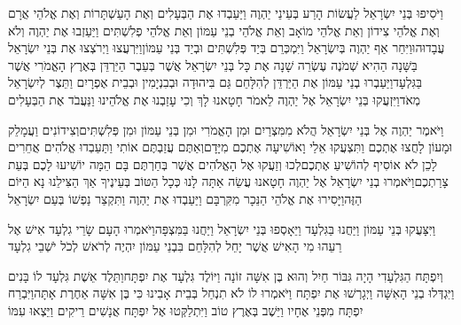\documentclass[../main/main.tex]{subfiles}
\begin{document}
\begin{multicols*}{\ncols}
וַיֹּסִיפוּ בְּנֵי יִשְׂרָאֵל לַעֲשׂוֹת הָרַע בְּעֵינֵי יַהְוֶה וַיַּעַבְדוּ אֶת הַבְּעָלִים וְאֶת הָעַשְׁתָּרוֹת וְאֶת אֱלֹהֵי אֲרָם וְאֶת אֱלֹהֵי צִידוֹן וְאֵת אֱלֹהֵי מוֹאָב וְאֵת אֱלֹהֵי בְנֵי עַמּוֹן וְאֵת אֱלֹהֵי פְלִשְׁתִּים וַיַּעַזְבוּ אֶת יַהְוֶה וְלֹא עֲבָדוּהוּ\PreVerseSpace{}וַיִּחַר אַף יַהְוֶה בְּיִשְׂרָאֵל וַיִּמְכְּרֵם בְּיַד פְּלִשְׁתִּים וּבְיַד בְּנֵי עַמּוֹן\PreVerseSpace{}וַיִּרְעֲצוּ וַיְרֹצְצוּ אֶת בְּנֵי יִשְׂרָאֵל בַּשָּׁנָה הַהִיא שְׁמֹנֶה עֶשְׂרֵה שָׁנָה אֶת כָּל בְּנֵי יִשְׂרָאֵל אֲשֶׁר בְּעֵבֶר הַיַּרְדֵּן בְּאֶרֶץ הָאֱמֹרִי אֲשֶׁר בַּגִּלְעָד\PreVerseSpace{}וַיַּעַבְרוּ בְנֵי עַמּוֹן אֶת הַיַּרְדֵּן לְהִלָּחֵם גַּם בִּיהוּדָה וּבְבִנְיָמִין וּבְבֵית אֶפְרָיִם וַתֵּצֶר לְיִשְׂרָאֵל מְאֹד\PreVerseSpace{}וַיִּזְעֲקוּ בְּנֵי יִשְׂרָאֵל אֶל יַהְוֶה לֵאמֹר חָטָאנוּ לָךְ וְכִי עָזַבְנוּ אֶת אֱלֹהֵינוּ וַנַּעֲבֹד אֶת הַבְּעָלִים\OpenSection{}\par
{}וַיֹּאמֶר יַהְוֶה אֶל בְּנֵי יִשְׂרָאֵל הֲלֹא מִמִּצְרַיִם וּמִן הָאֱמֹרִי וּמִן בְּנֵי עַמּוֹן וּמִן פְּלִשְׁתִּים\PreVerseSpace{}וְצִידוֹנִים וַעֲמָלֵק וּמָעוֹן לָחֲצוּ אֶתְכֶם וַתִּצְעֲקוּ אֵלַי וָאוֹשִׁיעָה אֶתְכֶם מִיָּדָם\PreVerseSpace{}וְאַתֶּם עֲזַבְתֶּם אוֹתִי וַתַּעַבְדוּ אֱלֹהִים אֲחֵרִים לָכֵן לֹא אוֹסִיף לְהוֹשִׁיעַ אֶתְכֶם\PreVerseSpace{}לְכוּ וְזַעֲקוּ אֶל הָאֱלֹהִים אֲשֶׁר בְּחַרְתֶּם בָּם הֵמָּה יוֹשִׁיעוּ לָכֶם בְּעֵת צָרַתְכֶם\PreVerseSpace{}וַיֹּאמְרוּ בְנֵי יִשְׂרָאֵל אֶל יַהְוֶה חָטָאנוּ עֲשֵׂה אַתָּה לָנוּ כְּכָל הַטּוֹב בְּעֵינֶיךָ אַךְ הַצִּילֵנוּ נָא הַיּוֹם הַזֶּה\PreVerseSpace{}וַיָּסִירוּ אֶת אֱלֹהֵי הַנֵּכָר מִקִּרְבָּם וַיַּעַבְדוּ אֶת יַהְוֶה וַתִּקְצַר נַפְשׁוֹ בְּעַם\SubEnd{} יִשְׂרָאֵל\OpenSection{}\par
{}וַיִּצָּעֲקוּ בְּנֵי עַמּוֹן וַיַּחֲנוּ בַּגִּלְעָד וַיֵּאָסְפוּ בְּנֵי יִשְׂרָאֵל וַיַּחֲנוּ בַּמִּצְפָּה\PreVerseSpace{}וַיֹּאמְרוּ הָעָם שָׂרֵי גִלְעָד אִישׁ אֶל רֵעֵהוּ מִי הָאִישׁ אֲשֶׁר יָחֵל לְהִלָּחֵם בִּבְנֵי עַמּוֹן יִהְיֶה לְרֹאשׁ לְכֹל יֹשְׁבֵי גִלְעָד\OpenSection{}\par
{}וְיִפְתָּח הַגִּלְעָדִי הָיָה גִּבּוֹר חַיִל וְהוּא בֶּן אִשָּׁה זוֹנָה וַיּוֹלֶד גִּלְעָד אֶת יִפְתָּח\PreVerseSpace{}וַתֵּלֶד אֵשֶׁת גִּלְעָד לוֹ בָּנִים וַיִּגְדְּלוּ בְנֵי הָאִשָּׁה וַיְגָרְשׁוּ אֶת יִפְתָּח וַיֹּאמְרוּ לוֹ לֹא תִנְחַל בְּבֵית אָבִינוּ כִּי בֶּן אִשָּׁה אַחֶרֶת אָתָּה\PreVerseSpace{}וַיִּבְרַח יִפְתָּח מִפְּנֵי אֶחָיו וַיֵּשֶׁב בְּאֶרֶץ טוֹב וַיִּתְלַקְּטוּ אֶל יִפְתָּח אֲנָשִׁים רֵיקִים וַיֵּצְאוּ עִמּוֹ\OpenSection{}\par

\end{multicols*}
\end{document}
